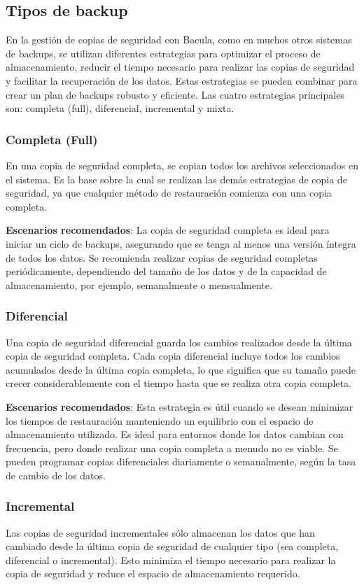 \subsection{Tipos de backup}
En la gestión de copias de seguridad con Bacula, como en muchos otros sistemas de backups, se utilizan diferentes estrategias para optimizar el proceso de almacenamiento, reducir el tiempo necesario para realizar las copias de seguridad y facilitar la recuperación de los datos. Estas estrategias se pueden combinar para crear un plan de backups robusto y eficiente. Las cuatro estrategias principales son: completa (full), diferencial, incremental y mixta.

\subsubsection{Completa (Full)}
En una copia de seguridad completa, se copian todos los archivos seleccionados en el sistema. Es la base sobre la cual se realizan las demás estrategias de copia de seguridad, ya que cualquier método de restauración comienza con una copia completa.

\textbf{Escenarios recomendados}: La copia de seguridad completa es ideal para iniciar un ciclo de backups, asegurando que se tenga al menos una versión íntegra de todos los datos. Se recomienda realizar copias de seguridad completas periódicamente, dependiendo del tamaño de los datos y de la capacidad de almacenamiento, por ejemplo, semanalmente o mensualmente.

\subsubsection{Diferencial}
Una copia de seguridad diferencial guarda los cambios realizados desde la última copia de seguridad completa. Cada copia diferencial incluye todos los cambios acumulados desde la última copia completa, lo que significa que su tamaño puede crecer considerablemente con el tiempo hasta que se realiza otra copia completa.

\textbf{Escenarios recomendados}: Esta estrategia es útil cuando se desean minimizar los tiempos de restauración manteniendo un equilibrio con el espacio de almacenamiento utilizado. Es ideal para entornos donde los datos cambian con frecuencia, pero donde realizar una copia completa a menudo no es viable. Se pueden programar copias diferenciales diariamente o semanalmente, según la tasa de cambio de los datos.

\subsubsection{Incremental}
Las copias de seguridad incrementales sólo almacenan los datos que han cambiado desde la última copia de seguridad de cualquier tipo (sea completa, diferencial o incremental). Esto minimiza el tiempo necesario para realizar la copia de seguridad y reduce el espacio de almacenamiento requerido.

